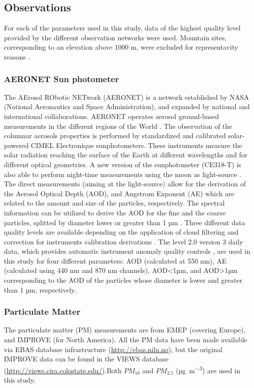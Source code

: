 \documentclass[journal abbreviation, manuscript]{copernicus}
\begin{document}
\subsection{Observations}

For each of the parameters used in this study, data of the highest quality level provided by the different observation networks were used. Mountain sites, corresponding to an elevation above 1000 m, were excluded for representavity reasons \citep{kinne2013mac}.

\subsubsection{AERONET Sun photometer}

The AErosol RObotic NETwork (AERONET) is a network established by NASA (National Aeronautics and Space Administration), and expanded by national and international collaborations. AERONET operates aerosol ground-based measurements in the different regions of the World \citep{holben2001emerging}. The observation of the columnar aerosols properties is performed by standardized and calibrated solar-powered CIMEL Electronique sunphotometers. These instruments measure the solar radiation reaching the surface of the Earth at different wavelengths and for different optical geometries. A new version of the sunphotometer (CE318-T) is also able to perform night-time measurements using the moon as light-source \citep{barreto2016new}. The direct measurements (aiming at the light-source) allow for the derivation of the Aerosol Optical Depth (AOD), and Angstrom Exponent (AE) which are related to the amount and size of the particles, respectively. The spectral information can be utilized to derive the AOD for the fine and the coarse particles, splitted by diameter lower or greater than 1 µm \citep{o2003spectral}. Three different data quality levels are available depending on the application of cloud filtering and correction for instruments calibration derivations \citep{smirnov2000cloud,smirnov2004aeronet}. The level 2.0 version 3 daily data, which provides automatic instrument anomaly quality controls \citep{giles2019advancements}, are used in this study for four different parameters:
AOD (calculated at 550 nm), AE (calculated using 440 nm and 870 nm channels), AOD<1µm, and AOD>1µm corresponding to the AOD of the particles whose diameter is lower and greater than 1 µm, respectively.

\subsubsection{Particulate Matter}
The particulate matter (PM) measurements are from EMEP (covering Europe), and IMPROVE (for North America). All the PM data have been made available via EBAS database infrastructure  (\url{http://ebas.nilu.no}), but the original IMPROVE data can be found in the VIEWS database (\url{http://views.cira.colostate.edu/}).Both $PM_{10}$ and $PM_{2.5}$ (\unit{µg.m^{-3}}) are used in this study.
\end{document}
